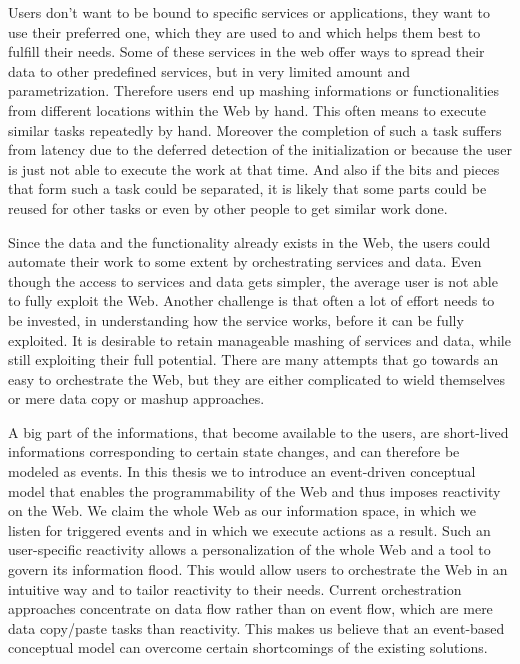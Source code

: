 Users don't want to be bound to specific services or applications, they want to use their preferred one, which they are used to and which helps them best to fulfill their needs.
Some of these services in the web offer ways to spread their data to other predefined services, but in very limited amount and parametrization.
Therefore users end up mashing informations or functionalities from different locations within the Web by hand.
This often means to execute similar tasks repeatedly by hand.
Moreover the completion of such a task suffers from latency due to the deferred detection of the initialization or because the user is just not able to execute the work at that time.
And also if the bits and pieces that form such a task could be separated, it is likely that some parts could be reused for other tasks or even by other people to get similar work done.

Since the data and the functionality already exists in the Web, the users could automate their work to some extent by orchestrating services and data.
Even though the access to services and data gets simpler, the average user is not able to fully exploit the Web.
Another challenge is that often a lot of effort needs to be invested, in understanding how the service works, before it can be fully exploited.
It is desirable to retain manageable mashing of services and data, while still exploiting their full potential.
There are many attempts that go towards an easy to orchestrate the Web, but they are either complicated to wield themselves or mere data copy or mashup approaches.

A big part of the informations, that become available to the users, are short-lived informations corresponding to certain state changes, and can therefore be modeled as events.
In this thesis we to introduce an event-driven conceptual model that enables the programmability of the Web and thus imposes reactivity on the Web.
We claim the whole Web as our information space, in which we listen for triggered events and in which we execute actions as a result.
Such an user-specific reactivity allows a personalization of the whole Web and a tool to govern its information flood.
This would allow users to orchestrate the Web in an intuitive way and to tailor reactivity to their needs.
Current orchestration approaches concentrate on data flow rather than on event flow, which are mere data copy/paste tasks than reactivity.
This makes us believe that an event-based conceptual model can overcome certain shortcomings of the existing solutions.


